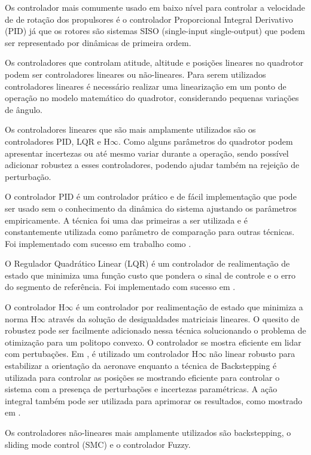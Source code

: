 Os controlador mais comumente usado em baixo nível para controlar a velocidade de de rotação dos propulsores é o controlador Proporcional Integral Derivativo (PID) já que os rotores são sistemas SISO (single-input single-output) que podem ser representado por dinâmicas de primeira ordem.

Os controladores que controlam atitude, altitude e posições lineares no quadrotor podem ser controladores lineares ou não-lineares. Para serem utilizados controladores lineares é necessário realizar uma linearização em um ponto de operação no modelo matemático do quadrotor, considerando pequenas variações de ângulo.

Os controladores lineares que são mais amplamente utilizados são os controladores PID, LQR e H$\infty$. Como alguns parâmetros do quadrotor podem apresentar incertezas ou até mesmo variar durante a operação, sendo possível adicionar robustez a esses controladores, podendo ajudar também na rejeição de perturbação. 

O controlador PID é um controlador prático e de fácil implementação que pode ser usado sem o conhecimento da dinâmica do sistema ajustando os parâmetros empiricamente. A técnica foi uma das primeiras a ser utilizada e é constantemente utilizada como parâmetro de comparação para outras técnicas. Foi implementado com sucesso em trabalho como \cite{bouabdallah2004design,Hoffmann2007}.

O Regulador Quadrático Linear (LQR) é um controlador de realimentação de estado que minimiza uma função custo que pondera o sinal de controle e o erro do segmento de referência. Foi implementado com sucesso em \cite{bouabdallah2004design,waslander2005multi}.

O controlador H$\infty$ é um controlador por realimentação de estado que minimiza a norma H$\infty$ através da solução de desigualdades matriciais lineares. O quesito de robustez pode ser facilmente adicionado nessa técnica solucionando o problema de otimização para um politopo convexo. O controlador se mostra eficiente em lidar com pertubações. Em \cite{raffo2008backstepping}, é utilizado um controlador H$\infty$ não linear robusto para estabilizar a orientação da aeronave enquanto a técnica de Backstepping é utilizada para controlar as posições se mostrando eficiente para controlar o sistema com a presença de perturbações e incertezas paramétricas. A ação integral também pode ser utilizada para aprimorar os resultados, como mostrado em \cite{Raffo2010}.

Os controladores não-lineares mais amplamente utilizados são backstepping, o sliding mode control (SMC) e o controlador Fuzzy.

